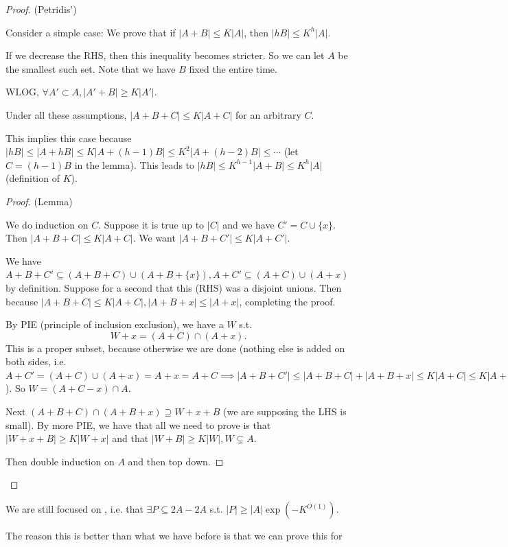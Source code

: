 \documentclass[a4paper]{article}
\begin{document}
\begin{proof}
	(Petridis')

	Consider a simple case:
	We prove that if $|A+B| \le K|A| $, then $|hB| \le K^h |A|$.

	If we decrease the RHS, then this inequality becomes stricter.
	So we can let $A $ be the smallest such set.
	Note that we have $B $ fixed the entire time.

	WLOG, $\forall A' \subset A, |A'+B| \ge K|A'| $.
	\begin{lem}
		Under all these assumptions, $|A+B+C| \le K|A+C| $ for an arbitrary $C $.
	\end{lem}

	This implies this case because $|hB| \le |A+hB| \le K|A+(h-1)B| \le K^2|A+(h-2)B| \le \cdots$ (let $C = (h-1)B $ in the lemma).
	This leads to $|hB| \le K^{h-1}|A+B| \le K^{h}|A|   $ (definition of $K $).

	\begin{proof}
		(Lemma)

		We do induction on $C $.
		Suppose it is true up to $|C| $ and we have $C' = C \cup \{x\}   $.
		Then $|A+B+C| \le K|A+C| $.
		We want $|A+B+C'| \le K|A+C'| $.

		We have $A+B+C' \subseteq (A+B+C)\cup (A+B+\{x\}), A+C' \subseteq (A+C) \cup (A+x)$ by definition.
		Suppose for a second that this (RHS) was a disjoint unions.
		Then because $|A+B+C| \le K|A+C|, |A+B+x| \le |A+x| $, completing the proof.

		By PIE (principle of inclusion exclusion), we have a $W $ s.t.
		\[
			W+x = (A+C)\cap (A+x)
		.\]
		This is a proper subset, because otherwise we are done (nothing else is added on both sides, i.e. $A+C' = (A+C)\cup(A+x) = A+x = A+C \implies |A+B+C'| \le |A+B+C|+|A+B+x| \le K|A+C| \le K|A+C'|$).
		So $W = (A+C-x) \cap A $.

		Next $(A+B+C)\cap(A+B+x) \supseteq W + x+B $ (we are supposing the LHS is small).
		By more PIE, we have that all we need to prove is that $|W+x+B| \ge K|W+x| $ and that $|W+B| \ge K|W|, W \subsetneq A $.

		Then double induction on $A $ and then top down.
	\end{proof}
\end{proof}

We are still focused on , i.e. that $\exists P\subseteq 2A-2A $ s.t. $|P| \ge |A| \exp(-K^{O(1)})  $.

The reason this is better than what we have before is that we can prove this for
\end{document}
